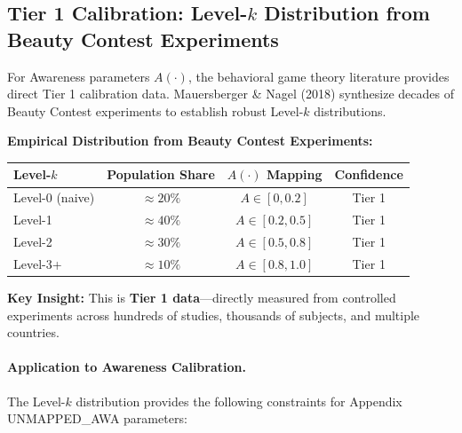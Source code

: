 
\subsection{Tier 1 Calibration: Level-$k$ Distribution from Beauty Contest Experiments}
\label{sec:BBB-level-k}

For Awareness parameters $A(\cdot)$, the behavioral game theory literature provides
direct Tier 1 calibration data. Mauersberger \& Nagel (2018) synthesize decades of
Beauty Contest experiments to establish robust Level-$k$ distributions.

\begin{tcolorbox}[colback=green!5!white, colframe=green!75!black,
    title=\textbf{Tier 1 Source: Level-$k$ Distribution (Mauersberger \& Nagel 2018)}]

\textbf{Empirical Distribution from Beauty Contest Experiments:}

\begin{center}
\renewcommand{\arraystretch}{1.3}
\begin{tabular}{@{}lccc@{}}
\toprule
\textbf{Level-$k$} & \textbf{Population Share} & \textbf{$A(\cdot)$ Mapping} & \textbf{Confidence} \\
\midrule
Level-0 (naive) & $\approx 20\%$ & $A \in [0, 0.2]$ & Tier 1 \\
Level-1 & $\approx 40\%$ & $A \in [0.2, 0.5]$ & Tier 1 \\
Level-2 & $\approx 30\%$ & $A \in [0.5, 0.8]$ & Tier 1 \\
Level-3+ & $\approx 10\%$ & $A \in [0.8, 1.0]$ & Tier 1 \\
\bottomrule
\end{tabular}
\end{center}

\textbf{Key Insight:} This is \textbf{Tier 1 data}---directly measured from controlled experiments
across hundreds of studies, thousands of subjects, and multiple countries.

\end{tcolorbox}

\paragraph{Application to Awareness Calibration.}
The Level-$k$ distribution provides the following constraints for Appendix UNMAPPED_AWA parameters:

